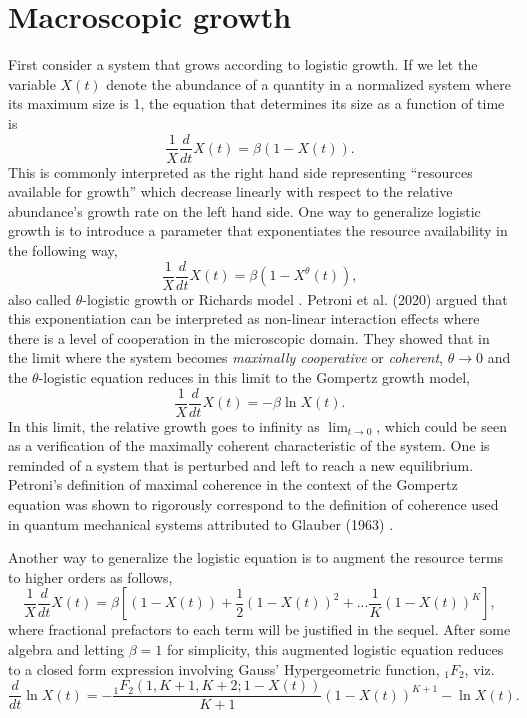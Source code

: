 \documentclass{article}
\begin{document}
\section{Macroscopic growth}
\label{sec:macro}

First consider a system that grows according to logistic growth. If we let the variable $X(t)$ denote the abundance of a quantity in a normalized system where its maximum size is 1, the equation that determines its size as a function of time is
\begin{equation}
  \frac{1}{X}\frac{d}{dt} X(t) = \beta (1 - X(t)).
\end{equation}
This is commonly interpreted as the right hand side representing ``resources available for growth'' which decrease linearly with respect to the relative abundance's growth rate on the left hand side. One way to generalize logistic growth is to introduce a parameter that exponentiates the resource availability in the following way,
\begin{equation}
\label{eq:Rich}
  \frac{1}{X}\frac{d}{dt} X(t) = \beta (1 - X^{\theta}(t)),
\end{equation}
also called $\theta$-logistic growth or Richards model \citep{richards1959flexible}. Petroni et al. (2020) argued that this exponentiation can be interpreted as non-linear interaction effects where there is a level of cooperation in the microscopic domain. They showed that in the limit where the system becomes \textit{maximally cooperative} or \textit{coherent}, $\theta\rightarrow 0$ and the $\theta$-logistic equation reduces in this limit to the Gompertz growth model,
 \begin{equation}
 \label{eq:Gomp}
  \frac{1}{X}\frac{d}{dt} X(t) = - \beta \ln X(t).
\end{equation}
In this limit, the relative growth goes to infinity as $\lim_{t\to 0}$, which could be seen as a verification of the maximally coherent characteristic of the system. One is reminded of a system that is perturbed and left to reach a new equilibrium. Petroni's definition of maximal coherence in the context of the Gompertz equation was shown to rigorously correspond to the definition of coherence used in quantum mechanical systems \cite{molski2003coherent} attributed to Glauber (1963) \cite{glauber1963coherent}.

Another way to generalize the logistic equation is to augment the resource terms to higher orders as follows,
\begin{equation}
  \frac{1}{X}\frac{d}{dt} X(t) = \beta \left[(1 - X(t)) + \frac{1}{2}(1 - X(t))^2 + ... \frac{1}{K}(1 - X(t))^K\right],
\end{equation}
where fractional prefactors to each term will be justified in the sequel.
After some algebra and letting $\beta=1$ for simplicity, this augmented logistic equation reduces to a closed form expression involving Gauss' Hypergeometric function, ${}_1F_{2}$, viz.
\begin{equation}
 \label{eq:modLogistic}
\frac{d}{dt}\ln{X(t)} = - \frac{{}_{1}F_{2}({1,K+1,K+2;1-X(t)})}{K+1}(1-X(t))^{K+1} - \ln{X(t)}.
 \end{equation}
\end{document}
